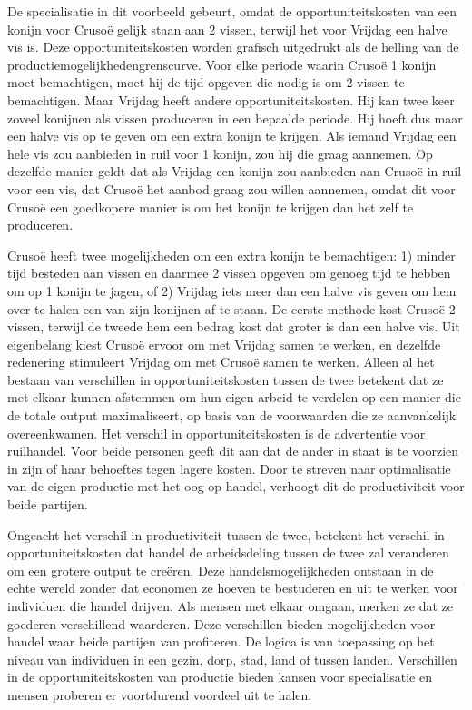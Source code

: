 De specialisatie in dit voorbeeld gebeurt, omdat de opportuniteitskosten van een konijn voor Crusoë gelijk staan aan 2 vissen, terwijl het voor Vrijdag een halve vis is. Deze opportuniteitskosten worden grafisch uitgedrukt als de helling van de productiemogelijkhedengrenscurve. Voor elke periode waarin Crusoë 1 konijn moet bemachtigen, moet hij de tijd opgeven die nodig is om 2 vissen te bemachtigen. Maar Vrijdag heeft andere opportuniteitskosten. Hij kan twee keer zoveel konijnen als vissen produceren in een bepaalde periode. Hij hoeft dus maar een halve vis op te geven om een extra konijn te krijgen. Als iemand Vrijdag een hele vis zou aanbieden in ruil voor 1 konijn, zou hij die graag aannemen. Op dezelfde manier geldt dat als Vrijdag een konijn zou aanbieden aan Crusoë in ruil voor een vis, dat Crusoë het aanbod graag zou willen aannemen, omdat dit voor Crusoë een goedkopere manier is om het konijn te krijgen dan het zelf te produceren.

Crusoë heeft twee mogelijkheden om een extra konijn te bemachtigen: 1) minder tijd besteden aan vissen en daarmee 2 vissen opgeven om genoeg tijd te hebben om op 1 konijn te jagen, of 2) Vrijdag iets meer dan een halve vis geven om hem over te halen een van zijn konijnen af te staan. De eerste methode kost Crusoë 2 vissen, terwijl de tweede hem een bedrag kost dat groter is dan een halve vis. Uit eigenbelang kiest Crusoë ervoor om met Vrijdag samen te werken, en dezelfde redenering stimuleert Vrijdag om met Crusoë samen te werken. Alleen al het bestaan van verschillen in opportuniteitskosten tussen de twee betekent dat ze met elkaar kunnen afstemmen om hun eigen arbeid te verdelen op een manier die de totale output maximaliseert, op basis van de voorwaarden die ze aanvankelijk overeenkwamen. Het verschil in opportuniteitskosten is de advertentie voor ruilhandel. Voor beide personen geeft dit aan dat de ander in staat is te voorzien in zijn of haar behoeftes tegen lagere kosten. Door te streven naar optimalisatie van de eigen productie met het oog op handel, verhoogt dit de productiviteit voor beide partijen.

Ongeacht het verschil in productiviteit tussen de twee, betekent het verschil in opportuniteitskosten dat handel de arbeidsdeling tussen de twee zal veranderen om een grotere output te creëren. Deze handelsmogelijkheden ontstaan in de echte wereld zonder dat economen ze hoeven te bestuderen en uit te werken voor individuen die handel drijven. Als mensen met elkaar omgaan, merken ze dat ze goederen verschillend waarderen. Deze verschillen bieden mogelijkheden voor handel waar beide partijen van profiteren. De logica is van toepassing op het niveau van individuen in een gezin, dorp, stad, land of tussen landen. Verschillen in de opportuniteitskosten van productie bieden kansen voor specialisatie en mensen proberen er voortdurend voordeel uit te halen.

